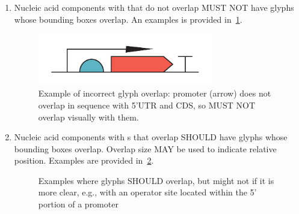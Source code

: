 \begin{enumerate}
\item Nucleic acid components with  that do not overlap MUST NOT have glyphs whose bounding boxes overlap.
	An examples is provided in~\ref{exa:2d}.
	\begin{figure}[h!]
	\centering
	\includegraphics[width=3in]{figures/examples/2d.pdf}
	\caption{Example of incorrect glyph overlap: promoter (arrow) does not overlap in sequence with 5'UTR and CDS, so MUST NOT overlap visually with them.}
	\label{exa:2d}
	\end{figure}

\item Nucleic acid components with s that overlap SHOULD have glyphs whose bounding boxes overlap.  Overlap size MAY be used to indicate relative position.
	Examples are provided in~\ref{exa:2e}.

	\begin{figure}[h!]
	\centering
	\caption{Examples where glyphs SHOULD overlap, but might not if it is more clear, e.g., with an operator site located within the 5' portion of a promoter}
	\label{exa:2e}
	\end{figure}


\end{enumerate}
